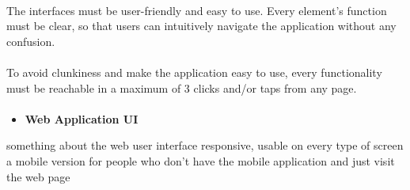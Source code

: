 \documentclass[english]{article}
\begin{document}
\begin{itemize}
\paragraph{}
The interfaces must be user-friendly and easy to use.
Every element's function must be clear, so that users can intuitively navigate the application without any confusion.

\paragraph{}
To avoid clunkiness and make the application easy to use, every functionality must be reachable in a maximum of 3 clicks and/or taps from any page.



 \paragraph{}

\begin{itemize}
	\item{\textbf{Web Application UI}}
\end{itemize}
something about the web user interface
responsive, usable on every type of screen
a mobile version for people who don't have the mobile application and just visit the web page



\end{itemize}
\end{document}
